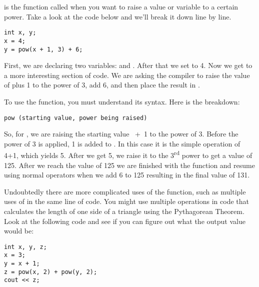 
 is the function called when you want to raise a value or variable to a certain power. 
Take a look at the code below and we'll break it down line by line.

\noindent\begin{minipage}{\linewidth}\begin{lstlisting}
int x, y;
x = 4;
y = pow(x + 1, 3) + 6;
\end{lstlisting}\end{minipage}

	First, we are declaring two variables:  and . 
	After that we set  to 4. 
	Now we get to a more interesting section of code. 
	We are asking the compiler to raise the value of  plus 1 to the power of 3, add 6, and then place the result in . 
	
	To use the  function, you must understand its syntax. 
	Here is the breakdown:

\noindent\begin{minipage}{\linewidth}\begin{lstlisting}
pow (starting value, power being raised)
\end{lstlisting}\end{minipage}

 	So, for , we are raising the starting value ~+~1 to the power of 3. 
 	Before the power of 3 is applied, 1 is added to . 
 	In this case it is the simple operation of 4+1, which yields 5. 
 	After we get 5, we raise it to the 3\textsuperscript{rd} power to get a value of 125. 
 	After we reach the value of 125 we are finished with the  function and resume using normal operators when we add 6 to 125 resulting in the final value of 131.  
	
	Undoubtedly there are more complicated uses of the  function, such as multiple uses of  in the same line of code. 
	You might use multiple  operations in code that calculates the length of one side of a triangle using the Pythagorean Theorem. 
	Look at the following code and see if you can figure out what the output value would be:

\noindent\begin{minipage}{\linewidth}\begin{lstlisting}
int x, y, z;
x = 3;
y = x + 1;
z = pow(x, 2) + pow(y, 2);
cout << z;
\end{lstlisting}\end{minipage}

